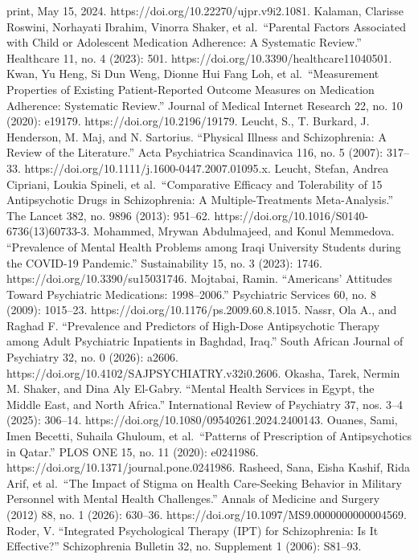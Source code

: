 print, May 15, 2024. https://doi.org/10.22270/ujpr.v9i2.1081. Kalaman,
Clarisse Roswini, Norhayati Ibrahim, Vinorra Shaker, et al.~``Parental
Factors Associated with Child or Adolescent Medication Adherence: A
Systematic Review.'' Healthcare 11, no. 4 (2023): 501.
https://doi.org/10.3390/healthcare11040501. Kwan, Yu Heng, Si Dun Weng,
Dionne Hui Fang Loh, et al.~``Measurement Properties of Existing
Patient-Reported Outcome Measures on Medication Adherence: Systematic
Review.'' Journal of Medical Internet Research 22, no. 10 (2020):
e19179. https://doi.org/10.2196/19179. Leucht, S., T. Burkard, J.
Henderson, M. Maj, and N. Sartorius. ``Physical Illness and
Schizophrenia: A Review of the Literature.'' Acta Psychiatrica
Scandinavica 116, no. 5 (2007): 317--33.
https://doi.org/10.1111/j.1600-0447.2007.01095.x. Leucht, Stefan, Andrea
Cipriani, Loukia Spineli, et al.~``Comparative Efficacy and Tolerability
of 15 Antipsychotic Drugs in Schizophrenia: A Multiple-Treatments
Meta-Analysis.'' The Lancet 382, no. 9896 (2013): 951--62.
https://doi.org/10.1016/S0140-6736(13)60733-3. Mohammed, Mrywan
Abdulmajeed, and Konul Memmedova. ``Prevalence of Mental Health Problems
among Iraqi University Students during the COVID-19 Pandemic.''
Sustainability 15, no. 3 (2023): 1746.
https://doi.org/10.3390/su15031746. Mojtabai, Ramin. ``Americans'
Attitudes Toward Psychiatric Medications: 1998--2006.'' Psychiatric
Services 60, no. 8 (2009): 1015--23.
https://doi.org/10.1176/ps.2009.60.8.1015. Nassr, Ola A., and Raghad F.
``Prevalence and Predictors of High-Dose Antipsychotic Therapy among
Adult Psychiatric Inpatients in Baghdad, Iraq.'' South African Journal
of Psychiatry 32, no. 0 (2026): a2606.
https://doi.org/10.4102/SAJPSYCHIATRY.v32i0.2606. Okasha, Tarek, Nermin
M. Shaker, and Dina Aly El-Gabry. ``Mental Health Services in Egypt, the
Middle East, and North Africa.'' International Review of Psychiatry 37,
nos. 3--4 (2025): 306--14.
https://doi.org/10.1080/09540261.2024.2400143. Ouanes, Sami, Imen
Becetti, Suhaila Ghuloum, et al.~``Patterns of Prescription of
Antipsychotics in Qatar.'' PLOS ONE 15, no. 11 (2020): e0241986.
https://doi.org/10.1371/journal.pone.0241986. Rasheed, Sana, Eisha
Kashif, Rida Arif, et al.~``The Impact of Stigma on Health Care-Seeking
Behavior in Military Personnel with Mental Health Challenges.'' Annals
of Medicine and Surgery (2012) 88, no. 1 (2026): 630--36.
https://doi.org/10.1097/MS9.0000000000004569. Roder, V. ``Integrated
Psychological Therapy (IPT) for Schizophrenia: Is It Effective?''
Schizophrenia Bulletin 32, no. Supplement 1 (2006): S81--93.

